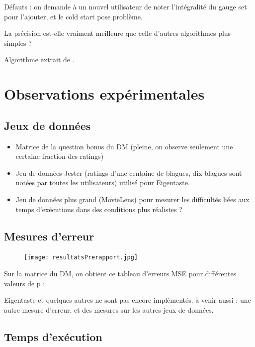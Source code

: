 		Défauts : on demande à un nouvel utilisateur de noter l'intégralité du gauge set pour l'ajouter, et le cold start pose problème.
		
		La précision est-elle vraiment meilleure que celle d'autres algorithmes plus simples ?
		
		Algorithme extrait de \cite{Goldberg2001}.
		
		
\section{Observations expérimentales}
	\subsection{Jeux de données}
		\begin{itemize}
			\item{Matrice de la question bonus du DM (pleine, on observe seulement une certaine fraction des ratings)}
			\item{Jeu de données Jester (ratings d'une centaine de blagues, dix blagues sont notées par toutes les utilisateurs) utilisé pour Eigentaste.}
			\item{Jeu de données plus grand (MovieLens) pour mesurer les difficultés liées aux temps d'exécutions dans des conditions plus réalistes ?}
		\end{itemize}
	\subsection{Mesures d'erreur}
	
		\begin{figure}[ht!]
			\centering
			\texttt{[image: resultatsPrerapport.jpg]}
		\end{figure}
		Sur la matrice du DM, on obtient ce tableau d'erreurs MSE pour différentes valeurs de p :
		
		Eigentaste et quelques autres ne sont pas encore implémentés.
		à venir aussi : une autre mesure d'erreur, et des mesures sur les autres jeux de données.
		
	\subsection{Temps d'exécution}
	
